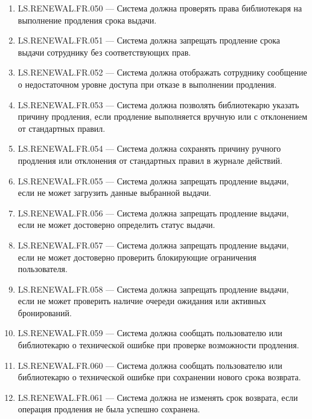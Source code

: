 \documentclass[12pt,a4paper]{article}
\begin{document}
\begin{enumerate}
		\item LS.RENEWAL.FR.050 --- Система должна проверять права библиотекаря на выполнение
		продления срока выдачи.
		
		\item LS.RENEWAL.FR.051 --- Система должна запрещать продление срока выдачи
		сотруднику без соответствующих прав.
		
		\item LS.RENEWAL.FR.052 --- Система должна отображать сотруднику сообщение
		о недостаточном уровне доступа при отказе в выполнении продления.
		
		\item LS.RENEWAL.FR.053 --- Система должна позволять библиотекарю указать причину
		продления, если продление выполняется вручную или с отклонением от стандартных
		правил.
		
		\item LS.RENEWAL.FR.054 --- Система должна сохранять причину ручного продления
		или отклонения от стандартных правил в журнале действий.
		
		\item LS.RENEWAL.FR.055 --- Система должна запрещать продление выдачи, если
		не может загрузить данные выбранной выдачи.
		
		\item LS.RENEWAL.FR.056 --- Система должна запрещать продление выдачи, если
		не может достоверно определить статус выдачи.
		
		\item LS.RENEWAL.FR.057 --- Система должна запрещать продление выдачи, если
		не может достоверно проверить блокирующие ограничения пользователя.
		
		\item LS.RENEWAL.FR.058 --- Система должна запрещать продление выдачи, если
		не может проверить наличие очереди ожидания или активных бронирований.
		
		\item LS.RENEWAL.FR.059 --- Система должна сообщать пользователю или библиотекарю
		о технической ошибке при проверке возможности продления.
		
		\item LS.RENEWAL.FR.060 --- Система должна сообщать пользователю или библиотекарю
		о технической ошибке при сохранении нового срока возврата.
		
		\item LS.RENEWAL.FR.061 --- Система должна не изменять срок возврата, если операция
		продления не была успешно сохранена.
		

\end{enumerate}
\end{document}
